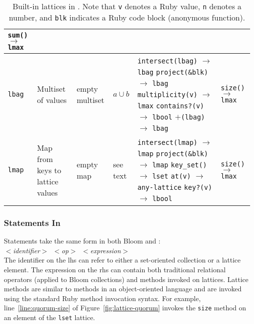 \begin{table*}[t]
\begin{center}
\begin{tabular}{|l|p{0.88in}|l|l|p{1.44in}|p{1.00in}|}
\texttt{sum()} $\to$ \texttt{lmax} \\
\hline
\texttt{lbag} & Multiset of values & empty multiset & $a \cup b$ &
\texttt{intersect(lbag)} $\to$ \texttt{lbag}\newline
\texttt{project(\&blk)} $\to$ \texttt{lbag}\newline
\texttt{multiplicity(v)} $\to$ \texttt{lmax}\newline
\texttt{contains?(v)} $\to$ \texttt{lbool}\newline
\texttt{$\mathtt{+}$(lbag)} $\to$ \texttt{lbag}
& \texttt{size()} $\to$ \texttt{lmax}\\
\hline
\texttt{lmap} & Map from keys to \newline{}lattice values & empty map & see text&
\texttt{intersect(lmap)} $\to$ \texttt{lmap}\newline
\texttt{project(\&blk)} $\to$ \texttt{lmap}\newline
\texttt{key\_set()} $\to$ \texttt{lset}\newline
\texttt{at(v)} $\to$ \texttt{any-lattice}\newline
\texttt{key?(v)} $\to$ \texttt{lbool}
& \texttt{size()} $\to$ \texttt{lmax}\\
\hline
\end{tabular}
\caption{Built-in lattices in \lang. Note that \texttt{v} denotes a Ruby value,
  \texttt{n} denotes a number, and \texttt{blk} indicates a Ruby code block
  (anonymous function).}
\label{tbl:built-in-lattices}
\end{center}
\end{table*}


\subsubsection{Statements In \lang}
Statements take the same form in both Bloom and \lang: \\ \noindent
\mbox{\hspace{0.25in}\emph{$<$identifier$>$ $<$op$>$
    $<$expression$>$}}\\ \noindent
The identifier on the lhs can refer to either a set-oriented collection or a
lattice element. The expression on the rhs can contain both traditional
relational operators (applied to Bloom collections) and methods invoked on
lattices.  Lattice methods are similar to methods in an object-oriented language
and are invoked using the standard Ruby method invocation syntax. For example,
line~\ref{line:quorum-size} of Figure~\ref{fig:lattice-quorum} invokes the
\texttt{size} method on an element of the \texttt{lset} lattice.

